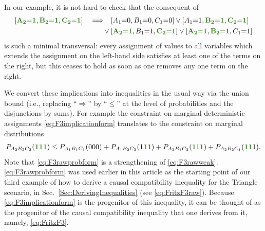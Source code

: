 {%

In our example, it is not hard to check that the consequent of
\begin{align}\begin{split}\label{eq:F3implicationform}
	\bracks{\mgreen{A_2 \eql 1}, \mgreen{B_2 \eql 1}, \mgreen{C_2 \eql 1}} \quad\Longrightarrow\quad &\bracks{A_1 \eql 0, B_1 \eql 0, C_1 \eql 0} \lor \bracks{A_1 \eql 1, \mgreen{B_2 \eql 1}, \mgreen{C_2 \eql 1}} \\
	\lor\: & \bracks{\mgreen{A_2 \eql 1}, B_1 \eql 1, \mgreen{C_2 \eql 1}} \lor \bracks{\mgreen{A_2 \eql 1}, \mgreen{B_2 \eql 1}, C_1 \eql 1}
\end{split}\end{align}
is such a minimal transversal: every assignment of values to all variables which extends the assignment on the left-hand side satisfies at least one of the terms on the right, but this ceases to hold as soon as one removes any one term on the right. 

We convert these implications into inequalities in the usual way via the union bound (i.e., replacing ``$\Rightarrow$'' by ``$\leq$'' at the level of probabilities and the disjunctions by sums). For example the constraint on marginal deterministic assignments \cref{eq:F3implicationform} translates to the constraint on marginal distributions
\begin{align}\label{eq:F3rawprobform}
    P_{A_2 B_2 C_2}\parens{\mgreen{1} \mgreen{1} \mgreen{1}} \leq P_{A_1 B_1 C_1}\parens{0 0 0}+P_{A_1 B_2 C_2}\parens{1 \mgreen{1 1}}+P_{A_2 B_1 C_2}\parens{\mgreen{1} 1 \mgreen{1}}+P_{A_2 B_2 C_1}\parens{\mgreen{1 1} 1}.
\end{align}
Note that \cref{eq:F3rawprobform} is a strengthening of \cref{eq:F3rawweak}.  \cref{eq:F3rawprobform} was used earlier in this article as the starting point of our third example of how to derive a causal compatibility inequality for the Triangle scenario, in Sec.~\ref{Sec:DerivingInequalities} (see \cref{eq:FritzF3raw}). Because \cref{eq:F3implicationform} is the progenitor of this inequality, it can be thought of as the progenitor of the causal compatibility inequality that one derives from it, namely, \cref{eq:FritzF3}.  


}
